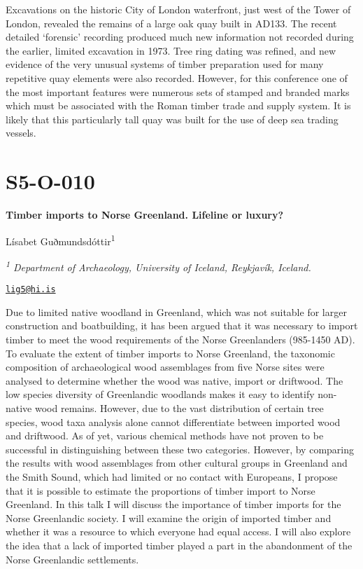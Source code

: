 \documentclass[
]{book}
\begin{document}
Excavations on the historic City of London waterfront, just west of the Tower of London, revealed the remains of a large oak quay built in AD133. The recent detailed `forensic' recording produced much new information not recorded during the earlier, limited excavation in 1973. Tree ring dating was refined, and new evidence of the very unusual systems of timber preparation used for many repetitive quay elements were also recorded. However, for this conference one of the most important features were numerous sets of stamped and branded marks which must be associated with the Roman timber trade and supply system. It is likely that this particularly tall quay was built for the use of deep sea trading vessels.

\hypertarget{s5-o-010}{%
\section*{S5-O-010}\label{s5-o-010}}

\textbf{Timber imports to Norse Greenland. Lifeline or luxury?}

Lísabet Guðmundsdóttir\textsuperscript{1}

\emph{\textsuperscript{1} Department of Archaeology, University of Iceland, Reykjavík, Iceland.}

\href{mailto:lig5@hi.is}{\nolinkurl{lig5@hi.is}}

Due to limited native woodland in Greenland, which was not suitable for larger construction and boatbuilding, it has been argued that it was necessary to import timber to meet the wood requirements of the Norse Greenlanders (985-1450 AD). To evaluate the extent of timber imports to Norse Greenland, the taxonomic composition of archaeological wood assemblages from five Norse sites were analysed to determine whether the wood was native, import or driftwood. The low species diversity of Greenlandic woodlands makes it easy to identify non-native wood remains. However, due to the vast distribution of certain tree species, wood taxa analysis alone cannot differentiate between imported wood and driftwood. As of yet, various chemical methods have not proven to be successful in distinguishing between these two categories. However, by comparing the results with wood assemblages from other cultural groups in Greenland and the Smith Sound, which had limited or no contact with Europeans, I propose that it is possible to estimate the proportions of timber import to Norse Greenland. In this talk I will discuss the importance of timber imports for the Norse Greenlandic society. I will examine the origin of imported timber and whether it was a resource to which everyone had equal access. I will also explore the idea that a lack of imported timber played a part in the abandonment of the Norse Greenlandic settlements.
\end{document}
